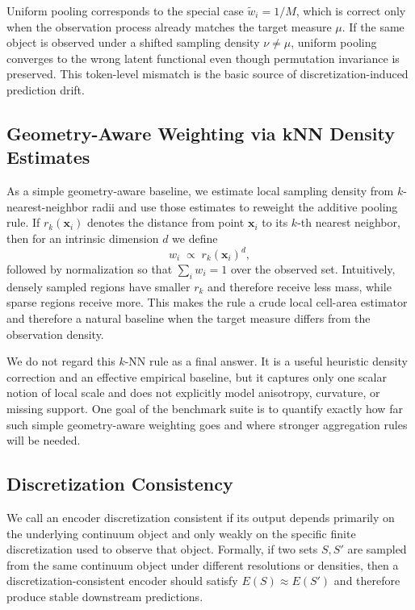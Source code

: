 \documentclass[11pt]{article}
\begin{document}
Uniform pooling corresponds to the special case $\tilde w_i=1/M$, which is
correct only when the observation process already matches the target measure
$\mu$.  If the same object is observed under a shifted sampling density
$\nu \neq \mu$, uniform pooling converges to the wrong latent functional even
though permutation invariance is preserved.  This token-level mismatch is the
basic source of discretization-induced prediction drift.

\subsection{Geometry-Aware Weighting via kNN Density Estimates}
\label{sec:method-aqp}

As a simple geometry-aware baseline, we estimate local sampling density from
$k$-nearest-neighbor radii and use those estimates to reweight the additive
pooling rule.  If $r_k(\boldsymbol{x}_i)$ denotes the distance from point
$\boldsymbol{x}_i$ to its
$k$-th nearest neighbor, then for an intrinsic dimension $d$ we define
\begin{equation}
  w_i \;\propto\; r_k(\boldsymbol{x}_i)^d,
\end{equation}
followed by normalization so that $\sum_i w_i = 1$ over the observed set.
Intuitively, densely sampled regions have smaller $r_k$ and therefore receive
less mass, while sparse regions receive more.  This makes the rule a crude
local cell-area estimator and therefore a natural baseline when the target
measure differs from the observation density.

We do not regard this $k$-NN rule as a final answer.  It is a useful
heuristic density correction and an effective empirical baseline, but it
captures only one scalar notion of local scale and does not explicitly model
anisotropy, curvature, or missing support.  One goal of the benchmark suite is
to quantify exactly how far such simple geometry-aware weighting goes and where
stronger aggregation rules will be needed.

\subsection{Discretization Consistency}
\label{sec:method-consistency}

We call an encoder discretization consistent if its output depends primarily on
the underlying continuum object and only weakly on the specific finite
discretization used to observe that object.  Formally, if two sets
$S,S'$ are sampled from the same continuum object under different resolutions
or densities, then a discretization-consistent encoder should satisfy
$E(S)\approx E(S')$ and therefore produce stable downstream predictions.
\end{document}

